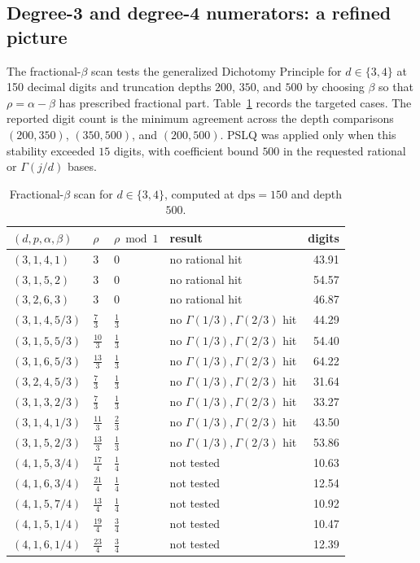 \subsection{Degree-3 and degree-4 numerators: a refined picture}\label{sec:d3-p1-a6-b53}

The fractional-$\beta$ scan tests the generalized Dichotomy Principle for $d \in \{3,4\}$ at 150 decimal digits and truncation depths $200$, $350$, and $500$ by choosing $\beta$ so that $\rho = \alpha - \beta$ has prescribed fractional part.
Table~\ref{tab:d34scan} records the targeted cases. The reported digit count is the minimum agreement across the depth comparisons $(200,350)$, $(350,500)$, and $(200,500)$. PSLQ was applied only when this stability exceeded $15$ digits, with coefficient bound $500$ in the requested rational or $\Gamma(j/d)$ bases.

\begin{table}[h]
\centering
\caption{Fractional-$\beta$ scan for $d \in \{3,4\}$, computed at $\mathrm{dps}=150$ and depth $500$.}
\label{tab:d34scan}
\scriptsize
\begin{tabular}{llllr}
\toprule
$(d,p,\alpha,\beta)$ & $\rho$ & $\rho \bmod 1$ & result & digits \\
\midrule
$( 3, 1, 4, 1 )$ & $3$ & $0$ & no rational hit & 43.91 \\
$( 3, 1, 5, 2 )$ & $3$ & $0$ & no rational hit & 54.57 \\
$( 3, 2, 6, 3 )$ & $3$ & $0$ & no rational hit & 46.87 \\
$( 3, 1, 4, 5/3 )$ & $\tfrac{7}{3}$ & $\tfrac{1}{3}$ & no $\Gamma(1/3),\Gamma(2/3)$ hit & 44.29 \\
$( 3, 1, 5, 5/3 )$ & $\tfrac{10}{3}$ & $\tfrac{1}{3}$ & no $\Gamma(1/3),\Gamma(2/3)$ hit & 54.40 \\
$( 3, 1, 6, 5/3 )$ & $\tfrac{13}{3}$ & $\tfrac{1}{3}$ & no $\Gamma(1/3),\Gamma(2/3)$ hit & 64.22 \\
$( 3, 2, 4, 5/3 )$ & $\tfrac{7}{3}$ & $\tfrac{1}{3}$ & no $\Gamma(1/3),\Gamma(2/3)$ hit & 31.64 \\
$( 3, 1, 3, 2/3 )$ & $\tfrac{7}{3}$ & $\tfrac{1}{3}$ & no $\Gamma(1/3),\Gamma(2/3)$ hit & 33.27 \\
$( 3, 1, 4, 1/3 )$ & $\tfrac{11}{3}$ & $\tfrac{2}{3}$ & no $\Gamma(1/3),\Gamma(2/3)$ hit & 43.50 \\
$( 3, 1, 5, 2/3 )$ & $\tfrac{13}{3}$ & $\tfrac{1}{3}$ & no $\Gamma(1/3),\Gamma(2/3)$ hit & 53.86 \\
$( 4, 1, 5, 3/4 )$ & $\tfrac{17}{4}$ & $\tfrac{1}{4}$ & not tested & 10.63 \\
$( 4, 1, 6, 3/4 )$ & $\tfrac{21}{4}$ & $\tfrac{1}{4}$ & not tested & 12.54 \\
$( 4, 1, 5, 7/4 )$ & $\tfrac{13}{4}$ & $\tfrac{1}{4}$ & not tested & 10.92 \\
$( 4, 1, 5, 1/4 )$ & $\tfrac{19}{4}$ & $\tfrac{3}{4}$ & not tested & 10.47 \\
$( 4, 1, 6, 1/4 )$ & $\tfrac{23}{4}$ & $\tfrac{3}{4}$ & not tested & 12.39 \\
\bottomrule
\end{tabular}
\end{table}

